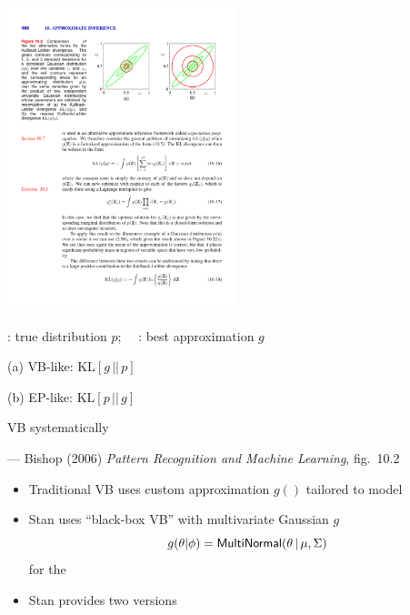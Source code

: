 \documentclass[10pt]{report}
\begin{document}
%
\vspace*{-4pt}
\begin{center}
\includegraphics[width=0.5\textwidth]{img/bishop-fig-10-2.pdf}
\end{center}
\vspace*{-10pt}
\begin{subitemize}
\item {}: true distribution $p$; \ \ : best
  approximation $g$
\begin{subitemize}
\item[(a)] VB-like: $\mbox{KL}[g \, || \, p]$
\item[(b)] EP-like: $\mbox{KL}[p \, || \, g]$
\end{subitemize}
\item VB systematically 
\end{subitemize}
\vfill \hfill
{\footnotesize  --- Bishop (2006) {\slshape Pattern Recognition and Machine Learning}, fig.~10.2}


%
\begin{itemize}
\item Traditional VB uses custom approximation $g()$ tailored to model
\item Stan uses ``black-box VB'' with multivariate Gaussian $g$
\[
g(\theta|\phi) = \text{\sf MultiNormal}(\theta \, | \, \mu, \Sigma)
\]
for the 
\item Stan provides two versions
\end{itemize}
\end{document}
